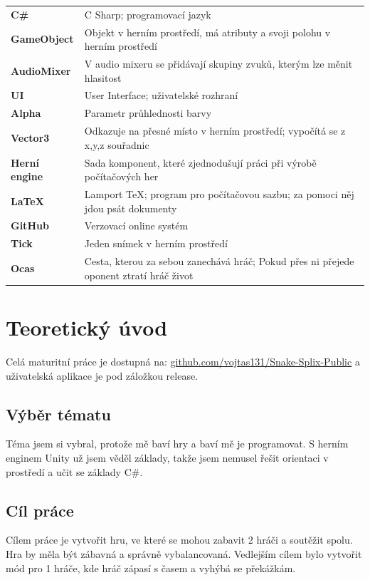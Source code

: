\documentclass[12pt,a4paper]{report}
\newcommand\T{\rule{0pt}{4ex}}%
\begin{document}
\begin{tabularx}{\textwidth}{l@{\hskip 2cm}X}
    \textbf{C\#} & C Sharp; programovací jazyk \\
    \T \textbf{GameObject} & Objekt v herním prostředí, má atributy a svoji polohu v herním prostředí \\
    \T \textbf{AudioMixer} & V audio mixeru se přidávají skupiny zvuků, kterým lze měnit hlasitost \\
    \T \textbf{UI} & User Interface; uživatelské rozhraní \\
    \T \textbf{Alpha} & Parametr průhlednosti barvy \\
    \T \textbf{Vector3} & Odkazuje na přesné místo v herním prostředí; vypočítá se z x,y,z souřadnic \\
    \T \textbf{Herní engine} & Sada komponent, které zjednodušují práci při výrobě počítačových her \\
    \T \textbf{LaTeX} & Lamport TeX; program pro počítačovou sazbu; za pomoci něj jdou psát dokumenty \\
    \T \textbf{GitHub} & Verzovací online systém \\
    \T \textbf{Tick} & Jeden snímek v herním prostředí \\
    \T \textbf{Ocas} & Cesta, kterou za sebou zanechává hráč; Pokud přes ni přejede oponent ztratí hráč život \\
\end{tabularx}

\chapter{Teoretický úvod}
Celá maturitní práce je dostupná na: \href{https://github.com/vojtas131/Snake-Splix-Public}{github.com/vojtas131/Snake-Splix-Public} a uživatelská aplikace je pod záložkou release.
\section{Výběr tématu}
Téma jsem si vybral, protože mě baví hry a baví mě je programovat.
S herním enginem Unity už jsem věděl základy, takže jsem nemusel řešit orientaci v prostředí a učit se základy C\#.

\section{Cíl práce}
Cílem práce je vytvořit hru, ve které se mohou zabavit 2 hráči a soutěžit spolu. Hra by měla být zábavná a správně vybalancovaná.
Vedlejším cílem bylo vytvořit mód pro 1 hráče, kde hráč zápasí s časem a vyhýbá se překážkám.
\end{document}
